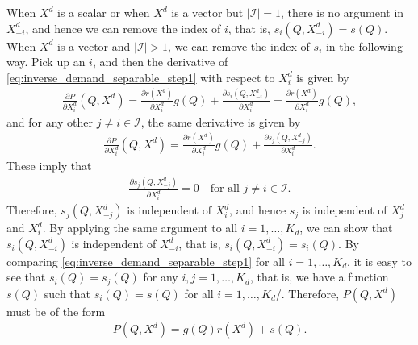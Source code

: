 \documentclass[11pt, a4paper]{article}
\theoremstyle{remark}
\begin{document}
When $X^{d}$ is a scalar or when $X^{d}$ is a vector but $|\mathcal{I}| = 1$, there is no argument in $X^{d}_{-i}$, and hence we can remove the index of $i$, that is, $s_i(Q, X^{d}_{-i}) = s(Q)$.
When $X^{d}$ is a vector and $|\mathcal{I}| > 1$, we can remove the index of $s_i$ in the following way.
Pick up an $i$, and then the derivative of \eqref{eq:inverse_demand_separable_step1} with respect to $X^{d}_i$ is given by
\begin{align}
    \frac{\partial P}{\partial X^{d}_i}(Q, X^{d}) = \frac{\partial r(X^{d})}{\partial X^{d}_i} g(Q) + \frac{\partial s_i(Q, X^{d}_{-i})}{\partial X^{d}_i} = \frac{\partial r(X^{d})}{\partial X^{d}_i} g(Q),
\end{align}
and for any other $j \ne i \in \mathcal{I}$, the same derivative is given by
\begin{align}
    \frac{\partial P}{\partial X^{d}_i}(Q, X^{d}) = \frac{\partial r(X^{d})}{\partial X^{d}_i} g(Q) + \frac{\partial s_j(Q, X^{d}_{-j})}{\partial X^{d}_i}.
\end{align}
These imply that
\begin{align}
    \frac{\partial s_j(Q, X^{d}_{-j})}{\partial X^{d}_i} = 0 \quad \text{for all } j \ne i \in \mathcal{I}.
\end{align}
Therefore, $s_j(Q, X^{d}_{-j})$ is independent of $X^{d}_i$, and hence $s_j$ is independent of $X^{d}_j$ and $X^{d}_i$.
By applying the same argument to all $i = 1, \ldots, K_d$, we can show that $s_i(Q, X^{d}_{-i})$ is independent of $X^{d}_{-i}$, that is, $s_i(Q, X^{d}_{-i}) = s_i(Q)$.
By comparing \eqref{eq:inverse_demand_separable_step1} for all $i = 1, \ldots, K_d$, it is easy to see that $s_i(Q) = s_j(Q)$ for any $i,j = 1, \ldots, K_d$, that is, we have a function $s(Q)$ such that $s_i(Q) = s(Q)$ for all $i = 1, \ldots, K_d$/.
Therefore, $P(Q, X^{d})$ must be of the form
\begin{align}
    P(Q, X^{d}) = g(Q)r(X^{d}) + s(Q). \label{eq:inverse_demand_separable_c_i_constant}
\end{align}
\end{document}
